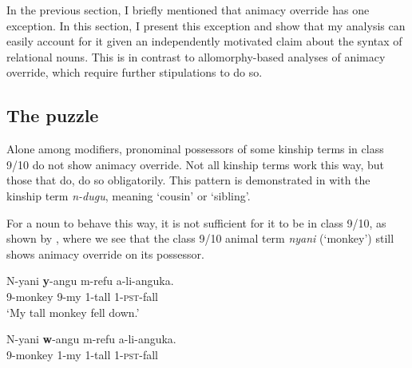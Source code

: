 \documentclass[output=paper,newtxmath,modfonts,nonflat,hidelinks]{langsci/langscibook}
\begin{document}
 
In the previous section, I briefly mentioned that animacy override has one exception.  In this section, I present this exception and show that my analysis can easily account for it given an independently motivated claim about the syntax of  relational nouns. This is in contrast to allomorphy-based analyses of animacy override, which require further stipulations to do so.
 
\subsection{The puzzle} \label{sec:pesetsky:puzzlesection}
 
Alone among modifiers, pronominal possessors of some kinship terms in class 9/10 do not show animacy override. Not all kinship terms work this way, but those that do, do so obligatorily.  This pattern is demonstrated in  with the kinship term \textit{n-dugu}, meaning `cousin' or `sibling'.
   
\ea\label{ex:pesetsky:contrast} 
      
   \z \z 

For a noun to behave this way, it is not sufficient for it to be in class 9/10, as shown by , where we see that the class 9/10 animal term \textit{nyani} (‘monkey’) still shows animacy override on its possessor.

\ea\label{ex:pesetsky:trastcon} 
\ea\label{ex:pesetsky:nyania}{ 
    \gll *N-yani \textbf{y}-angu m-refu a-li-anguka.  \\
       \textsc{9}-monkey \textsc{9}-my \textsc{1}-tall \textsc{1}-\textsc{pst}-fall  \\ 
        \glt `My tall monkey fell down.' } 
        
 \ex\label{ex:pesetsky:nyanib}{ \gll N-yani \textbf{w}-angu m-refu a-li-anguka. \\
\textsc{9}-monkey \textsc{1}-my \textsc{1}-tall \textsc{1}-\textsc{pst}-fall  \\ } \z \z
\end{document}
